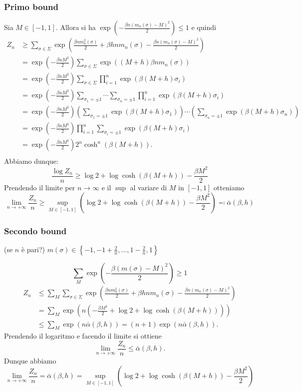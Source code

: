 \subsubsection{Primo bound}
Sia $ M \in [-1,1] $. Allora si ha $ \exp\left( -\frac{\beta n (m_n(\sigma) - M)^2}{2} \right) \leq 1 $ e quindi
\begin{align*}
    Z_n & \geq \sum_{\sigma \in \Sigma} \exp\left( \frac{\beta n m_n^2(\sigma)}{2} + \beta h n m_n(\sigma) - \frac{\beta n (m_n(\sigma)-M)^2}{2}\right) \\
        & = \exp\left( -\frac{\beta n M^2}{2} \right) \sum_{\sigma \in \Sigma} \exp\left( (M+h) \beta n m_n(\sigma) \right)                              \\
        & = \exp\left( -\frac{\beta n M^2}{2} \right) \sum_{\sigma \in \Sigma} \prod_{i=1}^{n} \exp( \beta(M+h) \sigma_i )                               \\
        & = \exp\left( -\frac{\beta n M^2}{2} \right) \sum_{\sigma_1 = \pm 1} \cdots \sum_{\sigma_n = \pm 1} \prod_{i=1}^{n} \exp( \beta(M+h) \sigma_i ) \\
        & = \exp\left( -\frac{\beta n M^2}{2} \right) \left(\sum_{\sigma_1 = \pm 1} \exp(\beta(M+h)\sigma_1)\right) \cdots \left(\sum_{\sigma_n = \pm 1} \exp(\beta(M+h)\sigma_n)\right) \\
        & = \exp\left( -\frac{\beta n M^2}{2} \right) \prod_{i=1}^{n} \sum_{\sigma_i = \pm 1} \exp(\beta(M+h)\sigma_i) \\
        & = \exp\left( -\frac{\beta n M^2}{2} \right) 2^n \cosh^n(\beta(M+h)). \\
\end{align*}
Abbiamo dunque:
\[ \frac{\log Z_n}{n} \geq \log 2 + \log\cosh(\beta(M+h)) - \frac{\beta M^2}{2} \]
Prendendo il limite per $ n\to\infty $ e il $ \sup $ al variare di $ M $ in $ [-1,1] $ otteniamo
\[ \lim_{n \to +\infty}\frac{Z_n}{n} \geq \sup_{M\in[-1,1]}\left( \log 2 + \log\cosh(\beta(M+h)) - \frac{\beta M^2}{2} \right) \eqqcolon \bar{\alpha}(\beta, h) \]

\subsubsection{Secondo bound}
(se $ n $ è pari?)
$ m(\sigma) \in \left\{ -1, -1 + \frac{2}{n}, \ldots, 1-\frac{2}{n}, 1 \right\} $

\[ \sum_M \exp\left( -\frac{\beta(m(\sigma)-M)^2}{2} \right) \geq 1 \]
\begin{align*}
    Z_n & \leq \sum_M \sum_{\sigma \in \Sigma} \exp\left( \frac{\beta n m_n^2(\sigma)}{2} + \beta h n m_n(\sigma) - \frac{\beta n (m_n(\sigma)-M)^2}{2}\right) \\
        & = \sum_M \exp\left( n\left( -\frac{\beta  M^2}{2} + \log 2 + \log\cosh(\beta(M+h)) \right) \right) \\
        & \leq \sum_M \exp(n \bar{\alpha}(\beta, h)) = (n+1) \exp(n \bar{\alpha}(\beta, h)).
\end{align*}
Prendendo il logaritmo e facendo il limite si ottiene
\[  \lim_{n \to +\infty} \frac{Z_n}{n} \leq \bar{\alpha}(\beta,h). \]
Dunque abbiamo
\[ \lim_{n \to +\infty}\frac{Z_n}{n} = \bar{\alpha}(\beta,h) = \sup_{M\in[-1,1]}\left( \log 2 + \log\cosh(\beta(M+h)) - \frac{\beta M^2}{2} \right) \]
